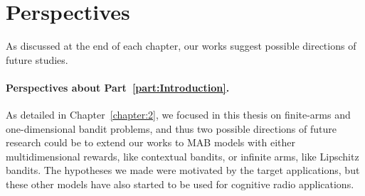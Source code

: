 \newpage

\section{Perspectives}

As discussed at the end of each chapter,
our works suggest possible directions of future studies.





\paragraph{Perspectives about \textbf{Part~\ref{part:Introduction}}.}



As detailed in Chapter~\ref{chapter:2}, we focused in this thesis on finite-arms and one-dimensional bandit problems,
and thus two possible directions of future research could be to extend our works
to MAB models with either multidimensional rewards, like contextual bandits, or infinite arms, like Lipschitz bandits.
The hypotheses we made were motivated by the target applications, but these other models have also started to be used for cognitive radio applications.



